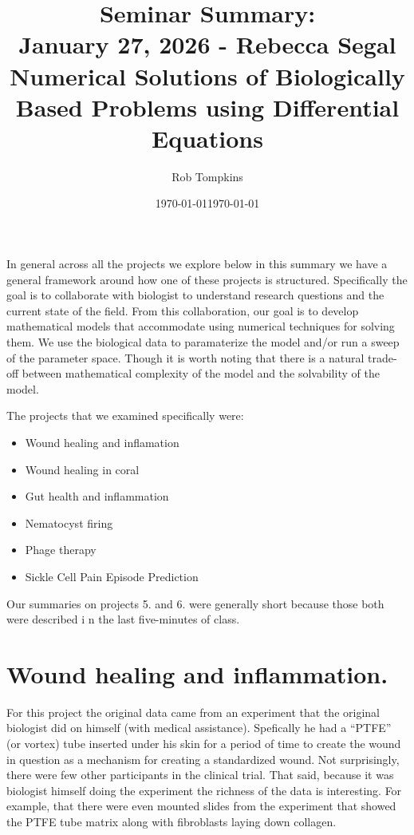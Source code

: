 \documentclass[12pt]{amsart}
\title{Seminar Summary:\\January 27, 2026 - Rebecca Segal\\Numerical Solutions of Biologically Based Problems using Differential Equations}
\author{Rob Tompkins}
\date{\today}
\begin{document}
    \maketitle
    \date{\today}
    \begin{onehalfspace}
        In general across all the projects we explore below in this summary we have a general
        framework around how one of these projects is structured.
        Specifically the goal is to collaborate with biologist to understand research questions
        and the current state of the field.
        From this collaboration, our goal is to develop mathematical models that accommodate
        using numerical techniques for solving them.
        We use the biological data to paramaterize the model and/or run a sweep of the parameter
        space.
        Though it is worth noting that there is a natural trade-off between mathematical
        complexity of the model and the solvability of the model.

        The projects that we examined specifically were:
        \begin{itemize}
            \item Wound healing and inflamation
            \item Wound healing in coral
            \item Gut health and inflammation
            \item Nematocyst firing
            \item Phage therapy
            \item Sickle Cell Pain Episode Prediction
        \end{itemize}
        Our summaries on projects 5. and 6. were generally short because those both were described i
        n the last five-minutes of class.

        \section{Wound healing and inflammation.} For this project the original data came from
        an experiment that the original biologist did on himself (with medical assistance).
        Spefically he had a ``PTFE'' (or vortex) tube inserted under his skin for a period
        of time to create the wound in question as a mechanism for creating a standardized wound.
        Not surprisingly, there were few other participants in the clinical trial.
        That said, because it was biologist himself doing the experiment the richness of the data
        is interesting.
        For example, that there were even mounted slides from the experiment that showed the
        PTFE tube matrix along with fibroblasts laying down collagen.


\end{onehalfspace}
\end{document}
